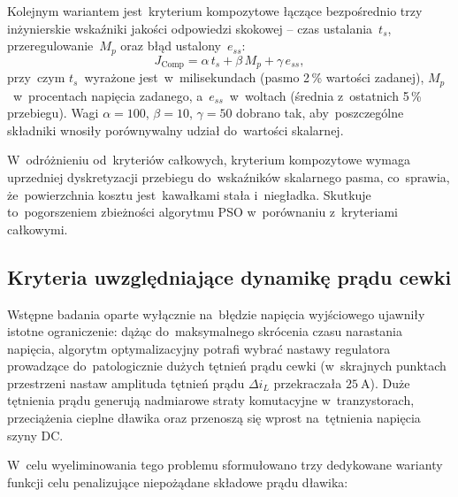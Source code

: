 Kolejnym wariantem jest~kryterium kompozytowe łączące bezpośrednio trzy inżynierskie wskaźniki jakości odpowiedzi skokowej -- czas ustalania~$t_s$, przeregulowanie~$M_p$ oraz błąd ustalony~$e_{ss}$:
\begin{equation}
    J_{\mathrm{Comp}} = \alpha\,t_s + \beta\,M_p + \gamma\,e_{ss},
    \label{eq:cost-composite}
\end{equation}
przy~czym $t_s$~wyrażone jest~w~milisekundach (pasmo 2\,\% wartości zadanej), $M_p$~w~procentach napięcia zadanego, a~$e_{ss}$~w~woltach (średnia z~ostatnich 5\,\% przebiegu). Wagi $\alpha = 100$, $\beta = 10$, $\gamma = 50$ dobrano tak, aby~poszczególne składniki wnosiły porównywalny udział do~wartości skalarnej.

W~odróżnieniu od~kryteriów całkowych, kryterium kompozytowe wymaga uprzedniej dyskretyzacji przebiegu do~wskaźników skalarnego pasma, co~sprawia, że~powierzchnia kosztu jest~kawałkami stała i~niegładka. Skutkuje to~pogorszeniem zbieżności algorytmu PSO w~porównaniu z~kryteriami całkowymi.

\subsection{Kryteria uwzględniające dynamikę prądu cewki}
\label{subsec:cost-current}

Wstępne badania oparte wyłącznie na~błędzie napięcia wyjściowego ujawniły istotne ograniczenie: dążąc do~maksymalnego skrócenia czasu narastania napięcia, algorytm optymalizacyjny potrafi wybrać nastawy regulatora prowadzące do~patologicznie dużych tętnień prądu cewki (w~skrajnych punktach przestrzeni nastaw amplituda tętnień prądu $\Delta i_L$ przekraczała $25~\mathrm{A}$). Duże tętnienia prądu generują nadmiarowe straty komutacyjne w~tranzystorach, przeciążenia cieplne dławika oraz przenoszą się wprost na~tętnienia napięcia szyny DC.

W~celu wyeliminowania tego problemu sformułowano trzy dedykowane warianty funkcji celu penalizujące niepożądane składowe prądu dławika:

